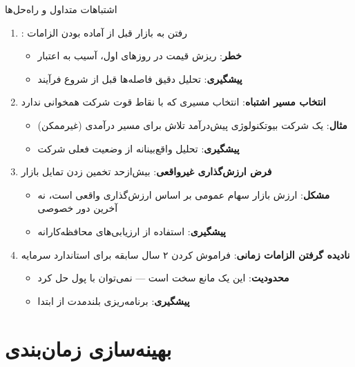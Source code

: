 \documentclass[10pt]{report}
\newcommand{\lat}[1]{\lr{#1}}
\begin{document}
\begin{warningbox}{اشتباهات متداول و راه‌حل‌ها}
\begin{enumerate}[rightmargin=1.5cm]
\item \textbf{\lat{Premature IPO}}: رفتن به بازار قبل از آماده بودن الزامات
  \begin{itemize}
  \item \textbf{خطر}: ریزش قیمت در روزهای اول، آسیب به اعتبار
  \item \textbf{پیشگیری}: تحلیل دقیق فاصله‌ها قبل از شروع فرآیند
  \end{itemize}

\item \textbf{انتخاب مسیر اشتباه}: انتخاب مسیری که با نقاط قوت شرکت همخوانی ندارد
  \begin{itemize}
  \item \textbf{مثال}: یک شرکت بیوتکنولوژی پیش‌درآمد تلاش برای مسیر درآمدی (غیرممکن)
  \item \textbf{پیشگیری}: تحلیل واقع‌بینانه از وضعیت فعلی شرکت
  \end{itemize}

\item \textbf{فرض ارزش‌گذاری غیرواقعی}: بیش‌ازحد تخمین زدن تمایل بازار
  \begin{itemize}
  \item \textbf{مشکل}: ارزش بازار سهام عمومی بر اساس ارزش‌گذاری \lat{IPO} واقعی است، نه آخرین دور خصوصی
  \item \textbf{پیشگیری}: استفاده از ارزیابی‌های محافظه‌کارانه
  \end{itemize}

\item \textbf{نادیده گرفتن الزامات زمانی}: فراموش کردن ۲ سال سابقه برای استاندارد سرمایه
  \begin{itemize}
  \item \textbf{محدودیت}: این یک مانع سخت است — نمی‌توان با پول حل کرد
  \item \textbf{پیشگیری}: برنامه‌ریزی بلندمدت از ابتدا
  \end{itemize}
\end{enumerate}
\end{warningbox}

\section{بهینه‌سازی زمان‌بندی}
\end{document}
